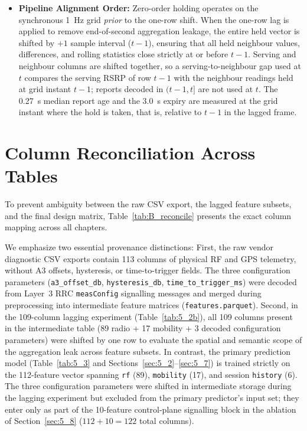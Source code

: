\begin{itemize}
    \item \textbf{Pipeline Alignment Order:} Zero-order holding operates on the synchronous 1~Hz grid \emph{prior} to the one-row shift. When the one-row lag is applied to remove end-of-second aggregation leakage, the entire held vector is shifted by $+1$ sample interval ($t-1$), ensuring that all held neighbour values, differences, and rolling statistics close strictly at or before $t-1$. Serving and neighbour columns are shifted together, so a serving-to-neighbour gap used at $t$ compares the serving RSRP of row $t-1$ with the neighbour readings held at grid instant $t-1$; reports decoded in $(t-1, t]$ are not used at $t$. The 0.27~s median report age and the 3.0~s expiry are measured at the grid instant where the hold is taken, that is, relative to $t-1$ in the lagged frame.
\end{itemize}

\section{Column Reconciliation Across Tables}
To prevent ambiguity between the raw CSV export, the lagged feature subsets, and the final design matrix, Table~\ref{tab:B_reconcile} presents the exact column mapping across all chapters. 

We emphasize two essential provenance distinctions:
First, the raw vendor diagnostic CSV exports contain 113 columns of physical RF and GPS telemetry, without A3 offsets, hysteresis, or time-to-trigger fields. The three configuration parameters (\texttt{a3\_offset\_db}, \texttt{hysteresis\_db}, \texttt{time\_to\_trigger\_ms}) were decoded from Layer~3 RRC \texttt{measConfig} signalling messages and merged during preprocessing into intermediate feature matrices (\texttt{features.parquet}). 
Second, in the 109-column lagging experiment (Table~\ref{tab:5_2b}), all 109 columns present in the intermediate table (89 radio + 17 mobility + 3 decoded configuration parameters) were shifted by one row to evaluate the spatial and semantic scope of the aggregation leak across feature subsets. In contrast, the primary prediction model (Table~\ref{tab:5_3} and Sections~\ref{sec:5_2}--\ref{sec:5_7}) is trained strictly on the 112-feature vector spanning \texttt{rf} (89), \texttt{mobility} (17), and session \texttt{history} (6). The three configuration parameters were shifted in intermediate storage during the lagging experiment but excluded from the primary predictor's input set; they enter only as part of the 10-feature control-plane signalling block in the ablation of Section~\ref{sec:5_8} ($112 + 10 = 122$ total columns).

